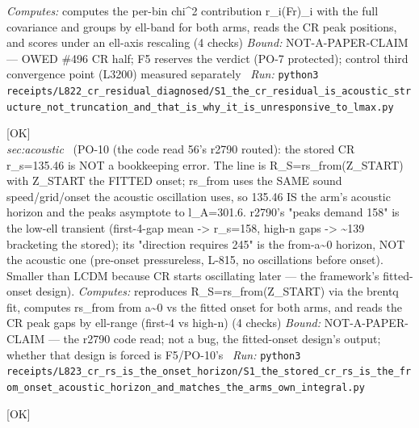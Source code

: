 \begin{description}
\emph{Computes:} computes the per-bin chi\textasciicircum{}2 contribution r\_i(Fr)\_i with the full covariance and groups by ell-band for both arms, reads the CR peak positions, and scores under an ell-axis rescaling (4 checks)
 \emph{Bound:} NOT-A-PAPER-CLAIM --- OWED \#496 CR half; F5 reserves the verdict (PO-7 protected); control third convergence point (L3200) measured separately
\ \emph{Run:} \texttt{python3 receipts/L822\_cr\_residual\_diagnosed/S1\_the\_cr\_residual\_is\_acoustic\_structure\_not\_truncation\_and\_that\_is\_why\_it\_is\_unresponsive\_to\_lmax.py}
\item[\label{rcpt:S1_the_stored_cr_rs_is_the_from_onset_acoustic_horizon_and_matches_the_arms_own_integral}\texttt{S1\_the\_stored\_cr\_rs\_is\_the\_from\_onset\_acoustic\_horizon\_and\_matches\_the\_arms\_own\_integral}]\hfill\textsf{[OK]}\\
\textit{sec:acoustic} \ (PO-10 (the code read 56's r2790 routed): the stored CR r\_s=135.46 is NOT a bookkeeping error. The line is R\_S=rs\_from(Z\_START) with Z\_START the FITTED onset; rs\_from uses the SAME sound speed/grid/onset the acoustic oscillation uses, so 135.46 IS the arm's acoustic horizon and the peaks asymptote to l\_A=301.6. r2790's "peaks demand 158" is the low-ell transient (first-4-gap mean -> r\_s=158, high-n gaps -> \textasciitilde{}139 bracketing the stored); its "direction requires 245" is the from-a\textasciitilde{}0 horizon, NOT the acoustic one (pre-onset pressureless, L-815, no oscillations before onset). Smaller than LCDM because CR starts oscillating later --- the framework's fitted-onset design). 
\emph{Computes:} reproduces R\_S=rs\_from(Z\_START) via the brentq fit, computes rs\_from from a\textasciitilde{}0 vs the fitted onset for both arms, and reads the CR peak gaps by ell-range (first-4 vs high-n) (4 checks)
 \emph{Bound:} NOT-A-PAPER-CLAIM --- the r2790 code read; not a bug, the fitted-onset design's output; whether that design is forced is F5/PO-10's
\ \emph{Run:} \texttt{python3 receipts/L823\_cr\_rs\_is\_the\_onset\_horizon/S1\_the\_stored\_cr\_rs\_is\_the\_from\_onset\_acoustic\_horizon\_and\_matches\_the\_arms\_own\_integral.py}
\item[\label{rcpt:S1_the_third_point_shows_the_control_converges_by_L3000_and_the_unlensed_floor_is_the_lensing}\texttt{S1\_the\_third\_point\_shows\_the\_control\_converges\_by\_L3000\_and\_the\_unlensed\_floor\_is\_the\_lensing}]\hfill\textsf{[OK]}\\

\end{description}
